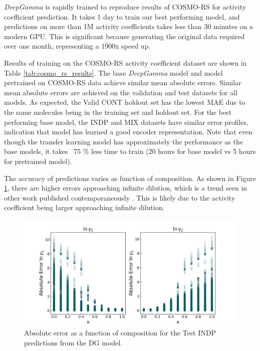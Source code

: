 \textit{DeepGamma} is rapidly trained to reproduce results of COSMO-RS for activity coefficient prediction. It takes 1 day to train our best performing model, and predictions on more than 1M activity coefficients takes less than 30 minutes on a modern GPU. This is significant because generating the original data required over one month, representing a 1900x speed up.


Results of training on the COSMO-RS activity coefficient dataset are shown in Table \ref{tab:cosmo_rs_results}. The base \textit{DeepGamma} model  and model pretrained on COSMO-RS data achieve similar mean absolute errors. Similar mean absolute errors are achieved on the validation and test datasets for all models. As expected, the Valid CONT holdout set has the lowest MAE due to the same molecules being in the training set and holdout set.  For the best performing base model, the INDP and MIX datasets have similar error profiles, indication that model has learned a good encoder representation.  Note that even though the transfer learning model has approximately the performance as the base models, it takes ~75 \% less time to train (20 hours for base model vs 5 hours for pretrained model). 

The accuracy of predictions varies as function of composition. As shown in Figure \ref{fig:absolute_error_composition}, there are higher errors approaching infinite dilution, which is a trend seen in other work published contemporaneously \cite{Winter2022}. This is likely due to the activity coefficient being larger approaching infinite dilution.

\begin{figure}
    \centering
    \includegraphics[width=\textwidth]{gfx/Chapter07/DG_test_indp_absolute_error_vs_composition.png}
    \caption{Absolute error as a function of composition for the Test INDP predictions from the DG model.}
    \label{fig:absolute_error_composition}
\end{figure}


